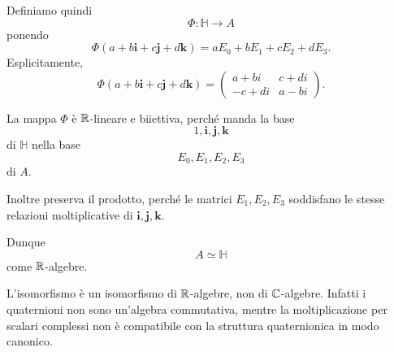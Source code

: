 \documentclass[a4paper]{article}
\begin{document}
\begin{radioactive}
\begin{snippetsolution}{}
    Definiamo quindi
    \[
        \Phi\colon \mathbb{H}\to A
    \]
    ponendo
    \[
        \Phi(a+b\mathbf{i}+c\mathbf{j}+d\mathbf{k})
        =
        aE_0+bE_1+cE_2+dE_3.
    \]
    Esplicitamente,
    \[
        \Phi(a+b\mathbf{i}+c\mathbf{j}+d\mathbf{k})
        =
        \begin{pmatrix}
            a+bi & c+di\\
            -c+di & a-bi
        \end{pmatrix}.
    \]

    La mappa \(\Phi\) è \(\mathbb{R}\)-lineare e biiettiva, perché manda la base
    \[
        1,\mathbf{i},\mathbf{j},\mathbf{k}
    \]
    di \(\mathbb{H}\) nella base
    \[
        E_0,E_1,E_2,E_3
    \]
    di \(A\).

    Inoltre preserva il prodotto, perché le matrici \(E_1,E_2,E_3\) soddisfano le stesse relazioni moltiplicative di \(\mathbf{i},\mathbf{j},\mathbf{k}\).

    Dunque
    \[
        A\simeq \mathbb{H}
    \]
    come \(\mathbb{R}\)-algebre.
\end{snippetsolution}
\end{radioactive}

\begin{radioactive}
\begin{snippetremark}{}
    L'isomorfismo è un isomorfismo di \(\mathbb{R}\)-algebre, non di \(\mathbb{C}\)-algebre. Infatti i quaternioni non sono un'algebra commutativa, mentre la moltiplicazione per scalari complessi non è compatibile con la struttura quaternionica in modo canonico.
\end{snippetremark}
\end{radioactive}
\end{document}
